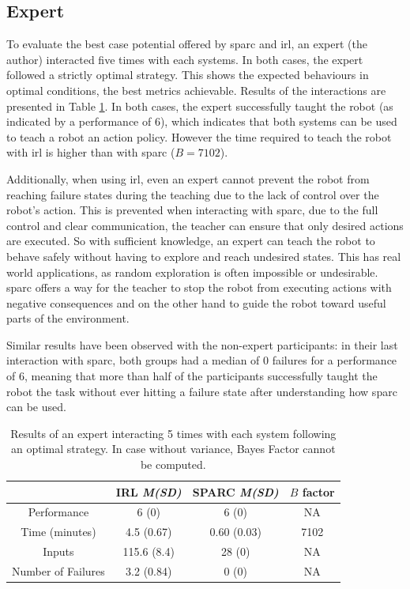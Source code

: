 \subsection{Expert} \label{ssec:control_expert}

To evaluate the best case potential offered by \gls{sparc} and \gls{irl}, an expert (the author) interacted five times with each systems. In both cases, the expert followed a strictly optimal strategy. This shows the expected behaviours in optimal conditions, the best metrics achievable. Results of the interactions are presented in Table \ref{tab:control_expert}. In both cases, the expert successfully taught the robot (as indicated by a performance of 6), which indicates that both systems can be used to teach a robot an action policy. However the time required to teach the robot with \gls{irl} is higher than with \gls{sparc} ($B=7102$). 

Additionally, when using \gls{irl}, even an expert cannot prevent the robot from reaching failure states during the teaching due to the lack of control over the robot's action. This is prevented when interacting with \gls{sparc}, due to the full control and clear communication, the teacher can ensure that only desired actions are executed. So with sufficient knowledge, an expert can teach the robot to behave safely without having to explore and reach undesired states. This has real world applications, as random exploration is often impossible or undesirable. \gls{sparc} offers a way for the teacher to stop the robot from executing actions with negative consequences and on the other hand to guide the robot toward useful parts of the environment.

Similar results have been observed with the non-expert participants: in their last interaction with \gls{sparc}, both groups had a median of 0 failures for a performance of 6, meaning that more than half of the participants successfully taught the robot the task without ever hitting a failure state after understanding how \gls{sparc} can be used.

\begin{table}[ht]
	\centering
	\caption{Results of an expert interacting 5 times with each system following an optimal strategy. In case without variance, Bayes Factor cannot be computed.}
	\label{tab:control_expert}
	\begin{tabular}{cccc}
	&IRL \textit{M(SD)} & SPARC \textit{M(SD)} & $B$ factor\\
		\midrule
		Performance & 6 (0) & 6 (0) & NA \\
		Time (minutes) & 4.5 (0.67) & 0.60 (0.03) & 7102 \\
		Inputs & 115.6 (8.4) & 28 (0) & NA \\
		Number of Failures & 3.2 (0.84) & 0 (0) & NA \\
	\end{tabular}
\end{table}

